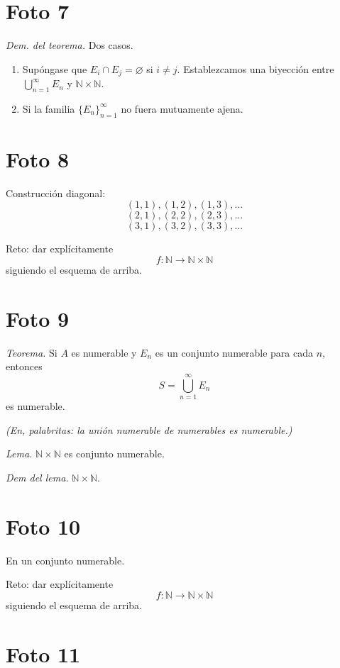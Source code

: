 \documentclass[12pt]{article}
\begin{document}
\section*{Foto 7}

\textit{Dem. del teorema.}
Dos casos.

\begin{enumerate}[label=\arabic*.]
    \item Sup\'ongase que $E_i\cap E_j=\varnothing$ si $i\neq j$. Establezcamos una biyecci\'on entre $\bigcup_{n=1}^\infty E_n$ y $\mathbb N\times\mathbb N$.
    \item Si la familia $\{E_n\}_{n=1}^\infty$ no fuera mutuamente ajena.
\end{enumerate}

\section*{Foto 8}

Construcci\'on diagonal:
\[
(1,1),(1,2),(1,3),\dots
\]
\[
(2,1),(2,2),(2,3),\dots
\]
\[
(3,1),(3,2),(3,3),\dots
\]

Reto: dar expl\'icitamente
\[
f\colon\mathbb N\to\mathbb N\times\mathbb N
\]
siguiendo el esquema de arriba.

\section*{Foto 9}

\textit{Teorema.} Si $A$ es numerable y $E_n$ es un conjunto numerable para cada $n$, entonces
\[
S=\bigcup_{n=1}^\infty E_n
\]
es numerable.

\textit{(En, palabritas: la uni\'on numerable de numerables es numerable.)}

\textit{Lema.} $\mathbb N\times\mathbb N$ es conjunto numerable.

\textit{Dem del lema.} $\mathbb N\times\mathbb N$.

\section*{Foto 10}

En un conjunto numerable.

Reto: dar expl\'icitamente
\[
f\colon\mathbb N\to\mathbb N\times\mathbb N
\]
siguiendo el esquema de arriba.

\section*{Foto 11}
\end{document}
